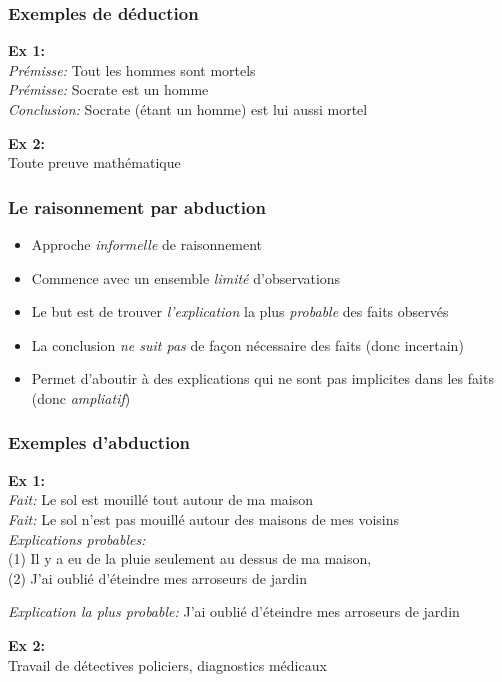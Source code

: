 \documentclass{beamer}
\begin{document}
\begin{frame}
    \frametitle{Exemples de déduction}
    \textbf{Ex 1:}\\ \pause
    \emph{Prémisse:} Tout les hommes sont mortels\\ \pause
    \emph{Prémisse:} Socrate est un homme\\ \pause
    \emph{Conclusion:} Socrate (étant un homme) est lui aussi mortel\

    \bigskip \pause

    \textbf{Ex 2:}\\
    Toute preuve mathématique
\end{frame}


\begin{frame}
    \frametitle{Le raisonnement par abduction}
    \begin{itemize}
      \item Approche \emph{informelle} de raisonnement \pause
      \item Commence avec un ensemble \emph{limité} d’observations \pause
      \item Le but est de trouver \emph{l’explication} la plus \emph{probable} des faits observés \pause
      \item La conclusion \emph{ne suit pas} de façon nécessaire des faits (donc incertain) \pause
      \item Permet d’aboutir à des explications qui ne sont pas
            implicites dans les faits (donc \emph{ampliatif})
    \end{itemize}
\end{frame}


\begin{frame}
    \frametitle{Exemples d'abduction}
    \textbf{Ex 1:}\\ \pause
    \emph{Fait:} Le sol est mouillé tout autour de ma maison\\ \pause
    \emph{Fait:} Le sol n'est pas mouillé autour des maisons de mes voisins\\ \pause
    \emph{Explications probables:}\\ \pause
          (1) Il y a eu de la pluie seulement au dessus de ma maison,\\ \pause
          (2) J'ai oublié d'éteindre mes arroseurs de jardin\\ \pause

    \smallskip

    \emph{Explication la plus probable:} J'ai oublié d'éteindre mes arroseurs de jardin\

    \bigskip \pause

    \textbf{Ex 2:}\\
    Travail de détectives policiers, diagnostics médicaux
\end{frame}
\end{document}
